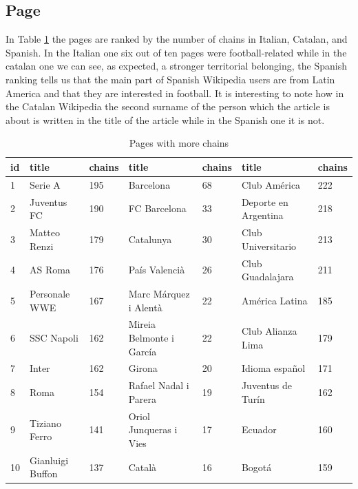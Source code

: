 \subsection{Page}
In Table \ref{table:morechains} the pages are ranked by the number of chains in Italian, Catalan,
and Spanish. In the Italian one six out of ten pages were football-related while in the catalan one
we can see, as expected, a stronger territorial belonging, the Spanish ranking tells us that the
main part of Spanish Wikipedia users are from Latin America and that they are interested in
football. It is interesting to note how in the Catalan Wikipedia the second surname of the person which the
article is about is written in the title of the article while in the Spanish one it is not.
\begin{table}[H]
    \centering
    \begin{tabularx}{\columnwidth}{@{}Xllllll@{}}
        \midrule
        \textbf{id} & \textbf{title} & \textbf{chains}& \textbf{title} & \textbf{chains} & \textbf{title} & \textbf{chains} \\ \toprule
        1 & Serie A & 195  & Barcelona & 68 & Club América & 222\\
        2 & Juventus FC & 190  & FC Barcelona & 33 & Deporte en Argentina & 218\\
        3 & Matteo Renzi & 179  & Catalunya & 30 & Club Universitario & 213\\
        4 & AS Roma & 176  &País Valencià& 26 & Club Guadalajara & 211\\
        5 & Personale WWE & 167  &Marc Márquez i Alentà & 22 & América Latina & 185\\
        6 & SSC Napoli & 162  & Mireia Belmonte i García& 22 & Club Alianza Lima & 179\\
        7 & Inter  & 162  &Girona & 20 & Idioma español & 171\\
        8 & Roma & 154 & Rafael Nadal i Parera & 19 & Juventus de Turín & 162\\
        9 & Tiziano Ferro & 141 & Oriol Junqueras i Vies& 17 & Ecuador & 160\\
        10 & Gianluigi Buffon & 137  &Català & 16 & Bogotá & 159\\
        
         \bottomrule
    \end{tabularx}
    
    \caption{Pages with more chains \label{table:morechains}}
\end{table}


